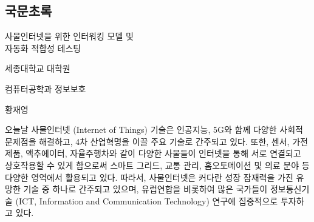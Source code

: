 \clearpage
{}

\begin{center}
    \section*{국문초록}
    \fontsize{16}{11}\textnormal {사물인터넷을 위한 인터워킹 모델 및 \\ 자동화 적합성 테스팅}
    
    \hfill

    \hspace{8.44cm}\fontsize{14}{11}\textnormal {세종대학교 대학원}
    
    \hspace{7.55cm}\fontsize{14}{11}\textnormal {컴퓨터공학과 정보보호}
    
    \hspace{11cm}\fontsize{14}{11}\textnormal {황재영}
    
    \hfill

\end{center}

오늘날 사물인터넷 (Internet of Things) 기술은 인공지능, 5G와 함께 다양한 사회적 문제점을 해결하고, 4차 산업혁명을 이끌 주요 기술로 간주되고 있다. 또한, 센서, 가전제품, 액추에이터, 자율주행차와 같이 다양한 사물들이 인터넷을 통해 서로 연결되고 상호작용할 수 있게 함으로써 스마트 그리드, 교통 관리, 홈오토메이션 및 의료 분야 등 다양한 영역에서 활용되고 있다. 따라서, 사물인터넷은 커다란 성장 잠재력을 가진 유망한 기술 중 하나로 간주되고 있으며, 유럽연합을 비롯하여 많은 국가들이 정보통신기술 (ICT, Information and Communication Technology) 연구에 집중적으로 투자하고 있다.

